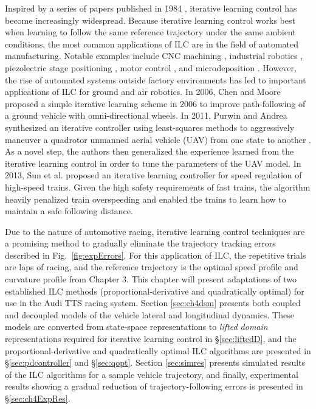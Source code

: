 Inspired by a series of papers published in 1984 \cite{arimoto}\cite{craig}\cite{kawamura}, iterative learning control has become increasingly widespread. Because
iterative learning control works best when learning to follow the same reference trajectory under the same ambient conditions, the most common applications
of ILC are in the field of automated manufacturing. Notable examples include CNC machining \cite{kimdi}, industrial robotics \cite{freeman}\cite{hladowski}, piezolectric stage
positioning \cite{huang}, motor control \cite{mohammad}, and microdeposition \cite{hoelzle}. However, the rise of automated systems outside
factory environments has led to important applications of ILC for ground and air robotics. In 2006, Chen and Moore \cite{chen} proposed
 a simple iterative learning scheme in 2006 to improve path-following of a ground vehicle with omni-directional wheels. In 2011, Purwin and Andrea synthesized
 an iterative controller using least-squares methods to aggressively maneuver a quadrotor
 unmanned aerial vehicle (UAV) from one state to another \cite{purwin}. As a novel step, the authors then generalized the experience learned
 from the iterative learning control in order to tune the parameters of the UAV model. In 2013, Sun et al. \cite{sun}
 proposed an iterative learning controller for speed regulation of high-speed trains. Given the high safety requirements of fast trains, the algorithm
heavily penalized train overspeeding and enabled the trains to learn how to maintain a safe following distance. 

Due to the nature of automotive racing, iterative learning control techniques are a promising method to gradually
eliminate the trajectory tracking errors described in Fig.~\ref{fig:expErrors}. For this application of ILC, the 
repetitive trials are laps of racing, and the reference trajectory is the optimal speed profile and curvature profile from Chapter 3. This chapter will 
present adaptations
of two established ILC methods (proportional-derivative and quadratically optimal) for use in the Audi TTS racing system. Section \ref{sec:ch4dsm} presents
both coupled and decoupled models of the vehicle lateral and longitudinal dynamics. These models are converted from state-space representations to \textit{lifted domain}
representations required for iterative learning control in \S \ref{sec:liftedD}, and the proportional-derivative and quadratically optimal ILC algorithms are presented
in \S \ref{sec:pdcontroller} and \S \ref{sec:qopt}. Section \ref{sec:simres} presents simulated results of the ILC algorithms for a sample vehicle trajectory, and finally,
experimental results showing a gradual reduction of trajectory-following errors is presented in \S \ref{sec:ch4ExpRes}.

